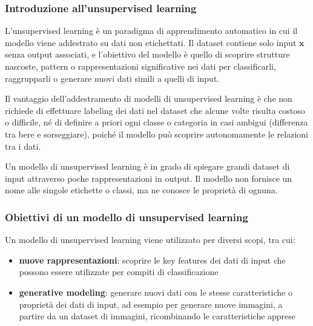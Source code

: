 \subsubsection*{Introduzione all'unsupervised learning}
L'unsupervised learning è un paradigma di apprendimento automatico in cui il modello viene addestrato su dati non etichettati.
Il dataset contiene solo input \(\textbf{x}\) senza output associati, e l'obiettivo del modello è quello di scoprire strutture
nascoste, pattern o rappresentazioni significative nei dati per classificarli, raggrupparli o generare nuovi dati simili a
quelli di input.

Il vantaggio dell'addestramento di modelli di unsupervised learning è che non richiede di effettuare labeling dei dati nel
dataset che alcune volte risulta costoso o difficile, né di definire a priori ogni classe o categoria in casi ambigui
(differenza tra bere e sorseggiare), poiché il modello può scoprire autonomamente le relazioni tra i dati.

Un modello di unsupervised learning è in grado di spiegare grandi dataset di input attraverso poche rappresentazioni in output.
Il modello non fornisce un nome alle singole etichette o classi, ma ne conosce le proprietà di ognuna.

\subsubsection*{Obiettivi di un modello di unsupervised learning}
Un modello di unsupervised learning viene utilizzato per diversi scopi, tra cui:
\begin{itemize}
	\item \textbf{nuove rappresentazioni}: scoprire le key features dei dati di input che possono essere utilizzate per compiti
	di classificazione
	\item \textbf{generative modeling}: generare nuovi dati con le stesse caratteristiche o proprietà dei dati di input, ad
	esempio per generare nuove immagini, a partire da un dataset di immagini, ricombinando le caratteristiche apprese
\end{itemize}

